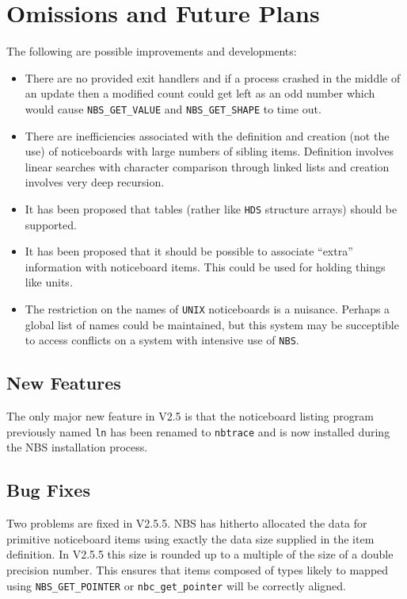 \documentclass[twoside,11pt,nolof]{starlink}
\begin{document}
\section {Omissions and Future Plans}

The following are possible improvements and developments:

\begin {itemize}
\item There are no provided exit handlers and if a process crashed in the
middle of an update then a modified count could get left as an odd number which
would cause \texttt{NBS\_GET\_VALUE} and \texttt{NBS\_GET\_SHAPE} to time out.
\item There are inefficiencies associated with the definition and creation
(not the use) of noticeboards with large numbers of sibling items. Definition
involves linear searches with character comparison through linked lists
and creation involves very deep recursion.
\item It has been proposed that tables (rather like \texttt{HDS} structure arrays)
should be supported.
\item It has been proposed that it should be possible to associate ``extra''
information with noticeboard items. This could be used for holding things like
units.
\item The restriction on the names of \texttt{UNIX} noticeboards is a
nuisance. Perhaps a global list of names could be maintained, but this
system may be succeptible to access conflicts on a system with intensive
use of \texttt{NBS}.
\end {itemize}

\subsection{New Features}
\label{V2.5 New Features}
The only major new feature in V2.5 is that the noticeboard listing
program previously named \texttt{ln} has been renamed to \texttt{nbtrace} and
is now installed during the NBS installation process.

\subsection {Bug Fixes}

Two problems are fixed in V2.5.5. NBS has hitherto allocated the data for
primitive noticeboard items using exactly the data size supplied in the
item definition. In V2.5.5 this size is rounded up to a multiple of the
size of a double precision number. This ensures that items composed of
types likely to mapped using \texttt{NBS\_GET\_POINTER} or
\texttt{nbc\_get\_pointer} will be correctly aligned.
\end{document}
